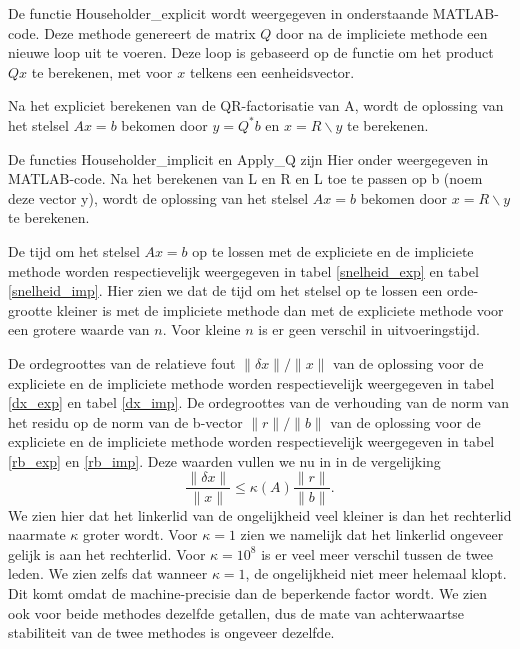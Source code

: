 De functie Householder\_explicit wordt weergegeven in onderstaande MATLAB-code. Deze methode genereert de matrix $Q$ door na de impliciete methode een nieuwe loop uit te voeren. Deze loop is gebaseerd op de functie om het product $Qx$ te berekenen, met voor $x$ telkens een eenheidsvector.

Na het expliciet berekenen van de QR-factorisatie van A, wordt de oplossing van het stelsel $Ax=b$ bekomen door $y = Q^*b$ en $x= R\backslash y$ te berekenen.



De functies Householder\_implicit en Apply\_Q zijn Hier onder weergegeven in MATLAB-code.
Na het berekenen van L en R en L toe te passen op b (noem deze vector y), wordt de oplossing van het stelsel $Ax=b$ bekomen door $x= R\backslash y$ te berekenen. 





De tijd om het stelsel $Ax=b$ op te lossen met de expliciete en de impliciete methode worden respectievelijk weergegeven in tabel \ref{snelheid_exp} en tabel \ref{snelheid_imp}. Hier zien we dat de tijd om het stelsel op te lossen een orde-grootte kleiner is met de impliciete methode dan met de expliciete methode voor een grotere waarde van $n$. Voor kleine $n$ is er geen verschil in uitvoeringstijd.

De ordegroottes van de relatieve fout $\lVert \delta x \rVert/\lVert x \rVert$ van de oplossing voor de expliciete en de impliciete methode worden respectievelijk weergegeven in tabel \ref{dx_exp} en tabel \ref{dx_imp}.
De ordegroottes van de verhouding van de norm van het residu op de norm van de b-vector $\lVert r \rVert/\lVert b \rVert$ van de oplossing voor de expliciete en de impliciete methode worden respectievelijk weergegeven in tabel \ref{rb_exp} en \ref{rb_imp}. Deze waarden vullen we nu in in de vergelijking
$$ \frac{\lVert \delta x \rVert}{\lVert x \rVert} \leq \kappa(A) \frac{\lVert r \rVert}{\lVert b \rVert}.$$
We zien hier dat het linkerlid van de ongelijkheid veel kleiner is dan het rechterlid naarmate $\kappa$ groter wordt. Voor $\kappa = 1$ zien we namelijk dat het linkerlid ongeveer gelijk is aan het rechterlid. Voor $\kappa = 10^8$ is er veel meer verschil tussen de twee leden. We zien zelfs dat wanneer $\kappa = 1$, de ongelijkheid niet meer helemaal klopt. Dit komt omdat de machine-precisie dan de beperkende factor wordt. We zien ook voor beide methodes dezelfde getallen, dus de mate van achterwaartse stabiliteit van de twee methodes is ongeveer dezelfde.

